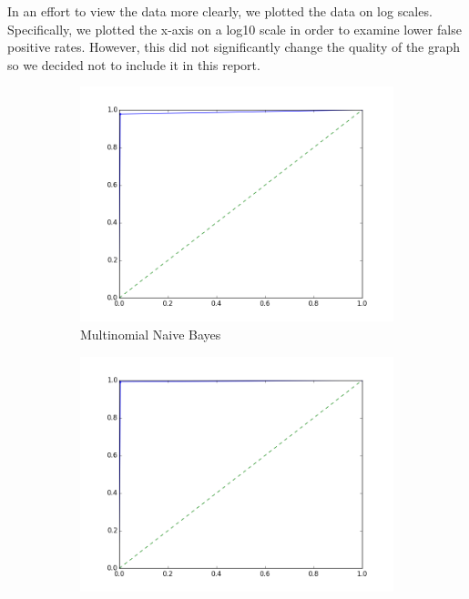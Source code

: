 \documentclass{article} %
\begin{document}
In an effort to view the data more clearly, we plotted the data on log scales. Specifically, we plotted the x-axis on a log10 scale in order to examine lower false positive rates. However, this did not significantly change the quality of the graph so we decided not to include it in this report. 

\begin{figure}[p]
  \centering
  \begin{subfigure}{0.45\textwidth}
    \includegraphics[width=\textwidth]{naive_bayes_roc_curve.png}
    \caption{Multinomial Naive Bayes}
  \end{subfigure}
  \begin{subfigure}{0.45\textwidth}
    \includegraphics[width=\textwidth]{decision_tree_roc_curve.png}

\end{subfigure}
\end{figure}
\end{document}
